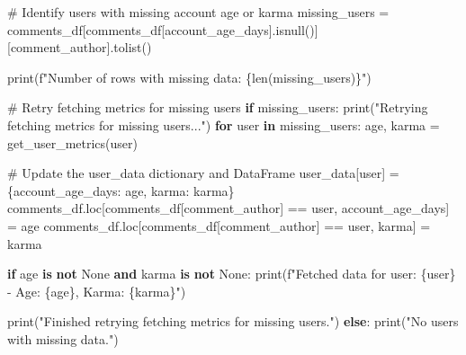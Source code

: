 \documentclass[
  12pt,
  letterpaper,
  DIV=11,
  numbers=noendperiod]{scrartcl}
\newenvironment{Shaded}{\begin{snugshade}}{\end{snugshade}}
\newcommand{\BuiltInTok}[1]{\textcolor[rgb]{0.00,0.23,0.31}{#1}}
\newcommand{\CommentTok}[1]{\textcolor[rgb]{0.37,0.37,0.37}{#1}}
\newcommand{\ControlFlowTok}[1]{\textcolor[rgb]{0.00,0.23,0.31}{\textbf{#1}}}
\newcommand{\KeywordTok}[1]{\textcolor[rgb]{0.00,0.23,0.31}{\textbf{#1}}}
\newcommand{\NormalTok}[1]{\textcolor[rgb]{0.00,0.23,0.31}{#1}}
\newcommand{\OperatorTok}[1]{\textcolor[rgb]{0.37,0.37,0.37}{#1}}
\newcommand{\SpecialCharTok}[1]{\textcolor[rgb]{0.37,0.37,0.37}{#1}}
\newcommand{\SpecialStringTok}[1]{\textcolor[rgb]{0.13,0.47,0.30}{#1}}
\newcommand{\StringTok}[1]{\textcolor[rgb]{0.13,0.47,0.30}{#1}}
\newcommand{\VariableTok}[1]{\textcolor[rgb]{0.07,0.07,0.07}{#1}}
\begin{document}
\begin{Shaded}
\begin{Highlighting}[]
\CommentTok{\# Identify users with missing account age or karma}
\NormalTok{missing\_users }\OperatorTok{=}\NormalTok{ comments\_df[comments\_df[}\StringTok{\textquotesingle{}account\_age\_days\textquotesingle{}}\NormalTok{].isnull()][}\StringTok{\textquotesingle{}comment\_author\textquotesingle{}}\NormalTok{].tolist()}

\BuiltInTok{print}\NormalTok{(}\SpecialStringTok{f"Number of rows with missing data: }\SpecialCharTok{\{}\BuiltInTok{len}\NormalTok{(missing\_users)}\SpecialCharTok{\}}\SpecialStringTok{"}\NormalTok{)}

\CommentTok{\# Retry fetching metrics for missing users}
\ControlFlowTok{if}\NormalTok{ missing\_users:}
    \BuiltInTok{print}\NormalTok{(}\StringTok{"Retrying fetching metrics for missing users..."}\NormalTok{)}
    \ControlFlowTok{for}\NormalTok{ user }\KeywordTok{in}\NormalTok{ missing\_users:}
\NormalTok{        age, karma }\OperatorTok{=}\NormalTok{ get\_user\_metrics(user)}
        
        \CommentTok{\# Update the user\_data dictionary and DataFrame}
\NormalTok{        user\_data[user] }\OperatorTok{=}\NormalTok{ \{}\StringTok{\textquotesingle{}account\_age\_days\textquotesingle{}}\NormalTok{: age, }\StringTok{\textquotesingle{}karma\textquotesingle{}}\NormalTok{: karma\}}
\NormalTok{        comments\_df.loc[comments\_df[}\StringTok{\textquotesingle{}comment\_author\textquotesingle{}}\NormalTok{] }\OperatorTok{==}\NormalTok{ user, }\StringTok{\textquotesingle{}account\_age\_days\textquotesingle{}}\NormalTok{] }\OperatorTok{=}\NormalTok{ age}
\NormalTok{        comments\_df.loc[comments\_df[}\StringTok{\textquotesingle{}comment\_author\textquotesingle{}}\NormalTok{] }\OperatorTok{==}\NormalTok{ user, }\StringTok{\textquotesingle{}karma\textquotesingle{}}\NormalTok{] }\OperatorTok{=}\NormalTok{ karma}
        
        \ControlFlowTok{if}\NormalTok{ age }\KeywordTok{is} \KeywordTok{not} \VariableTok{None} \KeywordTok{and}\NormalTok{ karma }\KeywordTok{is} \KeywordTok{not} \VariableTok{None}\NormalTok{:}
            \BuiltInTok{print}\NormalTok{(}\SpecialStringTok{f"Fetched data for user: }\SpecialCharTok{\{}\NormalTok{user}\SpecialCharTok{\}}\SpecialStringTok{ {-} Age: }\SpecialCharTok{\{}\NormalTok{age}\SpecialCharTok{\}}\SpecialStringTok{, Karma: }\SpecialCharTok{\{}\NormalTok{karma}\SpecialCharTok{\}}\SpecialStringTok{"}\NormalTok{)}

    \BuiltInTok{print}\NormalTok{(}\StringTok{"Finished retrying fetching metrics for missing users."}\NormalTok{)}
\ControlFlowTok{else}\NormalTok{:}
    \BuiltInTok{print}\NormalTok{(}\StringTok{"No users with missing data."}\NormalTok{)}


\end{Highlighting}
\end{Shaded}
\end{document}
